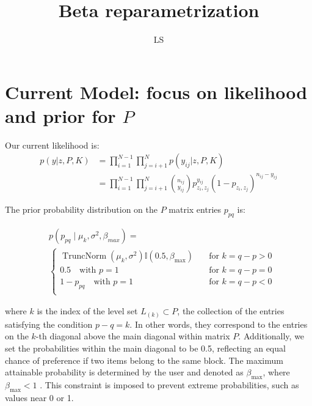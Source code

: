 \documentclass[11pt]{amsart}
\title{Beta reparametrization}
\author{LS}
\begin{document}
\maketitle
\tableofcontents
\section{Current Model: focus on likelihood and prior for $P$}
Our current likelihood is:
\begin{align}
p(y| z, P, K) &= \prod_{i =1 }^{N-1} \prod_{j =i+1}^{N} p(y_{ij} | z, P, K) \\ 
&= \prod_{i =1 }^{N-1} \prod_{j =i+1}^{N}  {n_{ij} \choose y_{ij}} p_{z_i, z_j}^{y_{ij}}(1- p_{z_i, z_j})^{n_{ij}-y_{ij}}
\end{align}

The prior probability distribution on the $P$ matrix entries $p_{pq}$ is:

\begin{align}
&p \left(p_{pq} \mid \mu_{k}, \sigma^2, \beta_{max} \right) = \\
&\begin{cases}
\operatorname{TruncNorm}\left(\mu_{k}, \sigma^2\right) \mathbb{I}\left(0.5,\beta_{\max}\right) \quad  &\text{for } k= q-p >0\\
0.5 \quad \text{with } p=1 &\text{for } k= q-p =0\\
1-p_{pq} \quad \text{with } p=1 &\text{for } k= q-p <0\\
\end{cases}
\end{align}

where $k$ is the index of the level set $L_{(k)} \subset P$, the collection of the entries satisfying the condition \(p - q = k\). In other words, they correspond to the entries on the \(k\)-th diagonal above the main diagonal within matrix \(P\). Additionally, we set the probabilities within the main diagonal to be 0.5, reflecting an equal chance of preference if two items belong to the same block. The maximum attainable probability is determined by the user and denoted as \(\beta_{\max}\), where \(\beta_{\max}<1\) . This constraint is imposed to prevent extreme probabilities, such as values near 0 or 1.
\end{document}
